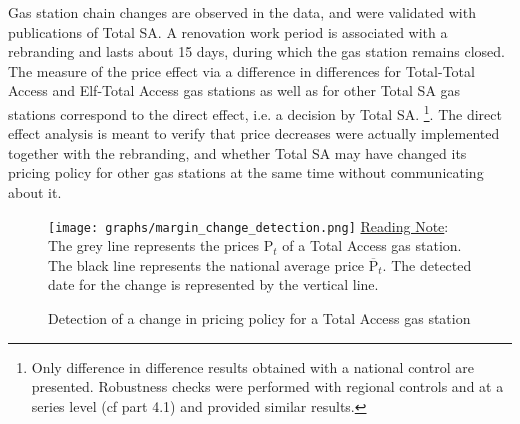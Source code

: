 \documentclass[english]{article}
\begin{document}
Gas station chain changes are observed in the data, and were validated with publications of Total SA. A renovation work period is associated with a rebranding and lasts about 15 days, during which the gas station remains closed. The measure of the price effect via a difference in differences for Total-Total Access and Elf-Total Access gas stations as well as for other Total SA gas stations correspond to the direct effect, i.e. a decision by Total SA.%
\footnote{Only difference in difference results obtained with a national control are presented. Robustness checks were performed with regional controls and at a series level (cf part 4.1) and provided similar results.%
}. The direct effect analysis is meant to verify that price decreases were actually implemented together with the rebranding, and whether Total SA may have changed its pricing policy for other gas stations at the same time without communicating about it.

\begin{figure}[htb!]
    \caption{Detection of a change in pricing policy for a Total Access gas station}
		\label{fig:margin_change_detection}
\texttt{[image: graphs/margin\_change\_detection.png]}
\flushleft
{\small{}\uline{Reading Note}}{\small{}: } The grey line represents the prices $\mathrm{P}_{t}$ of a Total Access gas station. The black line represents the national average price $\overline{\mathrm{P}}_{t}$. The detected date for the change is represented by the vertical line.\medskip{}
\end{figure}
\end{document}
